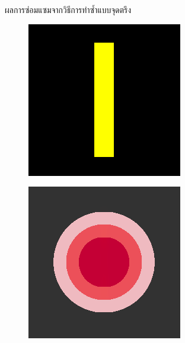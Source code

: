 \documentclass[xcolor=dvipsnames, xetex,serif]{beamer}
\numberwithin{equation}{section}
\begin{document}
\begin{frame}
\begin{figure}[H]
\begin{subfigure}{0.15\linewidth}
            \end{subfigure}
            \caption{ผลการซ่อมแซมจากวิธีการทำซ้ำแบบจุดตรึง}
        \end{figure}
        \begin{figure}[H]
            \centering
            \begin{subfigure}{0.15\linewidth}
                \centering
                \includegraphics[width=0.9\linewidth]{images/result_ex1/splitbergman01.png}
            \end{subfigure}
            \begin{subfigure}{0.15\linewidth}
                \centering
                \includegraphics[width=0.9\linewidth]{images/result_ex1/splitbergman02.png}

\end{subfigure}
\end{figure}
\end{frame}
\end{document}
